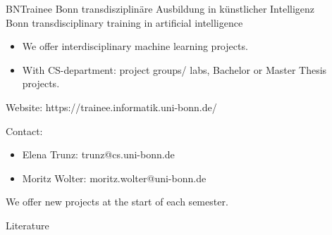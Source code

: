 \documentclass{beamer}
\begin{document}
    \begin{frame}{BNTrainee}
      Bonn transdisziplinäre Ausbildung in künstlicher Intelligenz \\
      Bonn transdisciplinary training in artificial intelligence
      \begin{itemize}
        \item We offer interdisciplinary machine learning projects.
        \item With CS-department: project groups/ labs, Bachelor or Master Thesis projects.
      \end{itemize}
      Website: https://trainee.informatik.uni-bonn.de/
      
      Contact:
      \begin{itemize}
        \item Elena Trunz: trunz@cs.uni-bonn.de
        \item Moritz Wolter: moritz.wolter@uni-bonn.de
      \end{itemize}
      We offer new projects at the start of each semester.
      \end{frame}
  
    


    \begin{frame}[allowframebreaks]{Literature}
      \printbibliography
    \end{frame}
\end{document}
